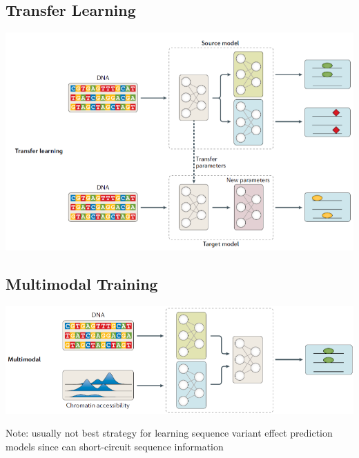 \documentclass[10pt]{article}
\begin{document}
\subsection*{Transfer Learning}
\begin{center} 
	\includegraphics*[width=\textwidth]{W8_24.png} 
\end{center}

\subsection*{Multimodal Training}
\begin{center} 
	\includegraphics*[width=\textwidth]{W8_25.png} 
\end{center}
Note: usually not best strategy for learning sequence variant effect prediction models since can short-circuit sequence information
\end{document}
